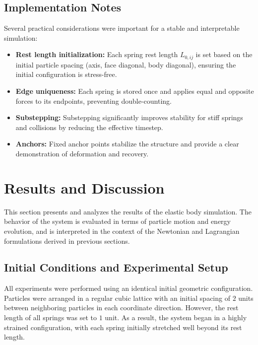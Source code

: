 \documentclass[manuscript,nonacm,12pt,letterpaper]{acmart}
\begin{document}
\subsection{Implementation Notes}
\label{Sec6.7:Implementation}

Several practical considerations were important for a stable and interpretable simulation:
\begin{itemize}
    \item \textbf{Rest length initialization:} Each spring rest length $L_{0,ij}$ is set based on the initial particle spacing (axis, face diagonal, body diagonal), ensuring the initial configuration is stress-free.
    \item \textbf{Edge uniqueness:} Each spring is stored once and applies equal and opposite forces to its endpoints, preventing double-counting.
    \item \textbf{Substepping:} Substepping significantly improves stability for stiff springs and collisions by reducing the effective timestep.
    \item \textbf{Anchors:} Fixed anchor points stabilize the structure and provide a clear demonstration of deformation and recovery.
\end{itemize}


\section{Results and Discussion}
\label{Sec7:Results}

This section presents and analyzes the results of the elastic body simulation. The behavior of the system is evaluated in terms of particle motion and energy evolution, and is interpreted in the context of the Newtonian and Lagrangian formulations derived in previous sections.

\subsection{Initial Conditions and Experimental Setup}
\label{Sec7.1:Init}

All experiments were performed using an identical initial geometric configuration. Particles were arranged in a regular cubic lattice with an initial spacing of $2$ units between neighboring particles in each coordinate direction. However, the rest length of all springs was set to $1$ unit. As a result, the system began in a highly strained configuration, with each spring initially stretched well beyond its rest length.
\end{document}
